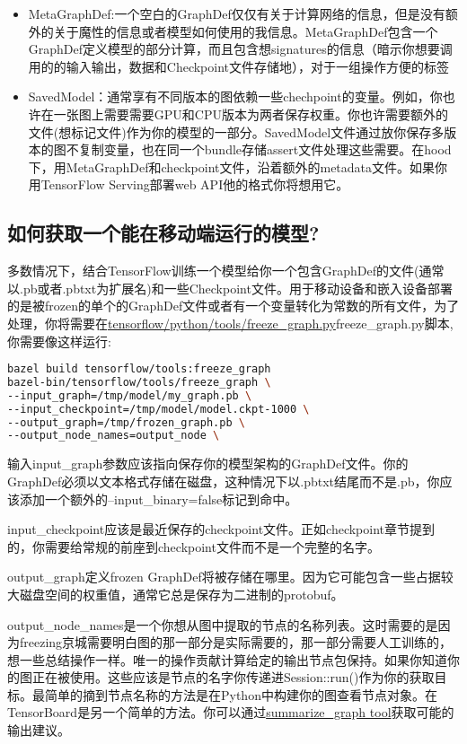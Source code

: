 \begin{itemize}
\item MetaGraphDef:一个空白的GraphDef仅仅有关于计算网络的信息，但是没有额外的关于魔性的信息或者模型如何使用的我信息。MetaGraphDef包含一个GraphDef定义模型的部分计算，而且包含想signatures的信息（暗示你想要调用的的输入输出，数据和Checkpoint文件存储地），对于一组操作方便的标签
\item SavedModel：通常享有不同版本的图依赖一些chechpoint的变量。例如，你也许在一张图上需要需要GPU和CPU版本为两者保存权重。你也许需要额外的文件(想标记文件)作为你的模型的一部分。SavedModel文件通过放你保存多版本的图不复制变量，也在同一个bundle存储assert文件处理这些需要。在hood下，用MetaGraphDef和checkpoint文件，沿着额外的metadata文件。如果你用TensorFlow Serving部署web API他的格式你将想用它。
\end{itemize}
\subsection{如何获取一个能在移动端运行的模型?}
多数情况下，结合TensorFlow训练一个模型给你一个包含GraphDef的文件(通常以.pb或者.pbtxt为扩展名)和一些Checkpoint文件。用于移动设备和嵌入设备部署的是被frozen的单个的GraphDef文件或者有一个变量转化为常数的所有文件，为了处理，你将需要在\href{https://www.github.com/tensorflow/tensorflow/blob/r1.4/tensorflow/python/tools/freeze_graph.py}{tensorflow/python/tools/freeze\_graph.py}freeze\_graph.py脚本,你需要像这样运行:
\begin{lstlisting}[language=Bash]
bazel build tensorflow/tools:freeze_graph
bazel-bin/tensorflow/tools/freeze_graph \
--input_graph=/tmp/model/my_graph.pb \
--input_checkpoint=/tmp/model/model.ckpt-1000 \
--output_graph=/tmp/frozen_graph.pb \
--output_node_names=output_node \
\end{lstlisting}
输入input\_graph参数应该指向保存你的模型架构的GraphDef文件。你的GraphDef必须以文本格式存储在磁盘，这种情况下以.pbtxt结尾而不是.pb，你应该添加一个额外的--input\_binary=false标记到命中。

input\_checkpoint应该是最近保存的checkpoint文件。正如checkpoint章节提到的，你需要给常规的前座到checkpoint文件而不是一个完整的名字。

output\_graph定义frozen GraphDef将被存储在哪里。因为它可能包含一些占据较大磁盘空间的权重值，通常它总是保存为二进制的protobuf。

output\_node\_names是一个你想从图中提取的节点的名称列表。这时需要的是因为freezing京城需要明白图的那一部分是实际需要的，那一部分需要人工训练的，想一些总结操作一样。唯一的操作贡献计算给定的输出节点包保持。如果你知道你的图正在被使用。这些应该是节点的名字你传递进Session::run()作为你的获取目标。最简单的摘到节点名称的方法是在Python中构建你的图查看节点对象。在TensorBoard是另一个简单的方法。你可以通过\href{https://github.com/tensorflow/tensorflow/tree/master/tensorflow/tools/graph_transforms/README#inspecting-graphs}{summarize\_graph tool}获取可能的输出建议。

